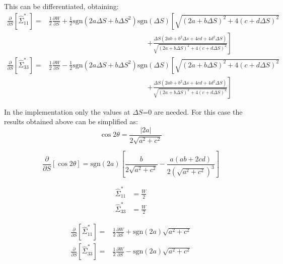 This can be differentiated, obtaining:
\begin{align}
\frac{\partial }{\partial S} \left[\hat{\Sigma}^*_{11} \right] =& \frac{1}{2}\frac{\partial W }{\partial S}
+\frac{1}{2}\mathrm{sgn}\left(2a\Delta S +b \Delta S^2 \right)\mathrm{sgn}(\Delta S)\left[
\sqrt{\left(2a +b \Delta S \right)^2 +4\left( c +d \Delta S\right)^2}
\right. \nonumber \\ & \qquad  \qquad \qquad \qquad \qquad  \qquad \qquad\left. 
+\frac{\Delta S \left(2ab+b^2 \Delta s +4 c d+ 4 d^2 \Delta S \right)}{\sqrt{\left(2a +b \Delta S \right)^2 +4\left( c +d \Delta S\right)^2}}
\right] \\
\frac{\partial }{\partial S} \left[\hat{\Sigma}^*_{33} \right] =& \frac{1}{2}\frac{\partial W }{\partial S}
-\frac{1}{2}\mathrm{sgn}\left(2a\Delta S +b \Delta S^2 \right)\mathrm{sgn}(\Delta S)\left[
\sqrt{\left(2a +b \Delta S \right)^2 +4\left( c +d \Delta S\right)^2}
\right. \nonumber \\ & \qquad  \qquad \qquad \qquad \qquad  \qquad \qquad\left. 
+\frac{\Delta S \left(2ab+b^2 \Delta s +4 c d+ 4 d^2 \Delta S \right)}{\sqrt{\left(2a +b \Delta S \right)^2 +4\left( c +d \Delta S\right)^2}}
\right] 
\end{align}

In the implementation only the values at $\Delta S$=0 are needed. For this case the results obtained above can be simplified as:
\begin{equation}
\cos 2 \theta = \frac{\left| 2a\right|}{2\sqrt{a^2 + c^2}}
\end{equation}

\begin{equation}
\frac{\partial }{\partial S} \left[ \cos 2\theta \right] = \mathrm{sgn}(2a)\left[
\frac{b}{2\sqrt{a^2 + c^2 }}-\frac{a(ab+2cd)}{2\left(\sqrt{a^2 + c^2}\right)^3}
\right]
\end{equation}

\begin{align}
\hat{\Sigma}^*_{11} &= \frac{W}{2}\\
\hat{\Sigma}^*_{33} &= \frac{W}{2}
\end{align}

\begin{align}
\frac{\partial }{\partial S} \left[\hat{\Sigma}^*_{11} \right] =& \frac{1}{2}\frac{\partial W }{\partial S}
+ \mathrm{sgn}(2a)\sqrt{a^2 + c^2 }
\\
\frac{\partial }{\partial S} \left[\hat{\Sigma}^*_{33} \right] =&\frac{1}{2}\frac{\partial W }{\partial S}
- \mathrm{sgn}(2a)\sqrt{a^2 + c^2 }
\end{align}


